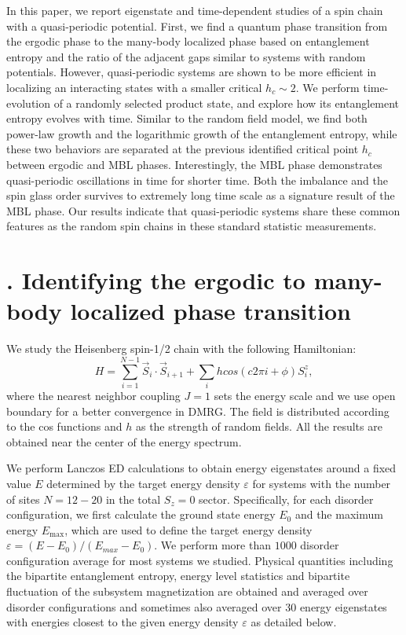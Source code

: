 \documentclass[prl,aps,epsf,showpacs,twocolumn]{revtex4}
\let\oldsection\section
\renewcommand{\section}[1]{\stepcounter{section}\oldsection{\Roman{section}. #1}}
\begin{document}
In this paper, we report  eigenstate and  time-dependent studies of a spin chain with a quasi-periodic potential.
First, we find a  quantum phase transition from the ergodic phase to the many-body localized phase based on
entanglement entropy and the ratio of the adjacent gaps similar to systems with random potentials. However, quasi-periodic
systems are shown to be more efficient in localizing an interacting states with a smaller critical $h_c \sim 2$.     
We perform time-evolution of a randomly selected  product state, and explore how its entanglement entropy
evolves with time.  Similar to the random field model, we find both power-law  growth and the logarithmic growth
of the entanglement entropy,  while these two  behaviors are separated at the previous identified critical point
$h_c$ between ergodic and MBL phases.   Interestingly,  the MBL phase demonstrates quasi-periodic oscillations
in time for shorter time.  Both the imbalance and the spin glass order survives to extremely long time scale
as a signature result of the MBL phase.   Our results indicate that quasi-periodic systems share these common
features as the random spin chains in these standard statistic measurements. 



\section{Identifying the ergodic to many-body localized phase transition}

We  study  the Heisenberg  spin-1/2 chain   
with  the following Hamiltonian:
\begin{equation}
 H =  \sum_{i=1}^{N-1} \vec{S}_i \cdot \vec{S}_{i+1}
  + \sum_{i} hcos(c2\pi i+\phi) S_i^z,\nonumber
\end{equation}
where the nearest neighbor  
 coupling  $J=1$  sets   the 
energy scale  and we use open boundary for a  better convergence  in DMRG.
The field  is distributed according to the cos functions and 
$h$ as the strength of  random fields.
All the results are obtained near  the center of the energy spectrum.


We  perform Lanczos ED calculations     to obtain  energy eigenstates around a fixed value
$E$ determined by the target  energy density $\varepsilon$ for  systems with the number of sites
$N=12-20$  in the total $S_z=0$ sector.
Specifically, for each disorder configuration, we first calculate the
ground state energy  $E_0$ and the maximum energy $E_\text{max}$, which are  used to define the target
energy density $\varepsilon = (E-E_0)/(E_{max} -E_0)$.
We perform more than $1000$ disorder configuration average for most  systems we studied.
Physical quantities\cite{luitz2015}  including the bipartite entanglement entropy,  energy level statistics and
bipartite  fluctuation of the subsystem magnetization are obtained and averaged over
  disorder configurations and sometimes also averaged over  30 energy eigenstates with energies closest to the given
energy density $\varepsilon$ as detailed below.
\end{document}
